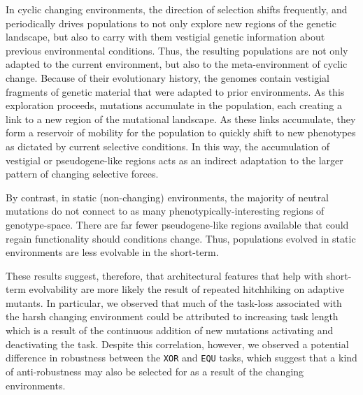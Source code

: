 \documentclass[10pt,letterpaper,final]{article}
\begin{document}
In cyclic changing environments, the direction of selection shifts frequently, and periodically drives populations to not only explore new regions of the genetic landscape, but also to carry with them vestigial genetic information about previous environmental conditions. Thus, the resulting populations are not only adapted to the current environment, but also to the meta-environment of cyclic change. Because of their evolutionary history, the genomes contain vestigial fragments of genetic material that were adapted to prior environments. As this exploration proceeds, mutations accumulate in the population, each creating a link to a new region of the mutational landscape. As these links accumulate, they form a reservoir of mobility for the population to quickly shift to new phenotypes as dictated by current selective conditions. In this way, the accumulation of vestigial or pseudogene-like regions acts as an indirect adaptation to the larger pattern of changing selective forces. 

By contrast, in static (non-changing) environments, the majority of neutral mutations do not connect to as many phenotypically-interesting regions of genotype-space. There are far fewer pseudogene-like regions available that could regain functionality should conditions change. Thus, populations evolved in static environments are less evolvable in the short-term.

These results suggest, therefore, that architectural features that help with short-term evolvability are more likely the result of repeated hitchhiking on adaptive mutants. In particular, we observed that much of the task-loss associated with the harsh changing environment could be attributed to increasing task length which is a result of the continuous addition of new mutations activating and deactivating the task. Despite this correlation, however, we observed a potential difference in robustness between the \texttt{XOR} and \texttt{EQU} tasks, which suggest that a kind of anti-robustness may also be selected for as a result of the changing environments.
\end{document}
